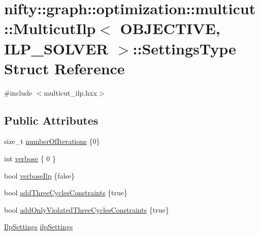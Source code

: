 \hypertarget{structnifty_1_1graph_1_1optimization_1_1multicut_1_1MulticutIlp_1_1SettingsType}{}\section{nifty\+:\+:graph\+:\+:optimization\+:\+:multicut\+:\+:Multicut\+Ilp$<$ O\+B\+J\+E\+C\+T\+I\+V\+E, I\+L\+P\+\_\+\+S\+O\+L\+V\+E\+R $>$\+:\+:Settings\+Type Struct Reference}
\label{structnifty_1_1graph_1_1optimization_1_1multicut_1_1MulticutIlp_1_1SettingsType}


{\ttfamily \#include $<$multicut\+\_\+ilp.\+hxx$>$}

\subsection*{Public Attributes}
\begin{DoxyCompactItemize}
\item 
size\+\_\+t \hyperlink{structnifty_1_1graph_1_1optimization_1_1multicut_1_1MulticutIlp_1_1SettingsType_a2c4240e17d6ac1872756bc9c1e50c1ca}{number\+Of\+Iterations} \{0\}
\item 
int \hyperlink{structnifty_1_1graph_1_1optimization_1_1multicut_1_1MulticutIlp_1_1SettingsType_a1c0ea9bfda256cb0a8049944f9ff3163}{verbose} \{ 0 \}
\item 
bool \hyperlink{structnifty_1_1graph_1_1optimization_1_1multicut_1_1MulticutIlp_1_1SettingsType_a21f5fd51ba414fc1ef13e42329072cb0}{verbose\+Ilp} \{false\}
\item 
bool \hyperlink{structnifty_1_1graph_1_1optimization_1_1multicut_1_1MulticutIlp_1_1SettingsType_a6a5e9a6a75b3289793cce6611c99b482}{add\+Three\+Cycles\+Constraints} \{true\}
\item 
bool \hyperlink{structnifty_1_1graph_1_1optimization_1_1multicut_1_1MulticutIlp_1_1SettingsType_a158132eb2567633736666a48f39ad8f1}{add\+Only\+Violated\+Three\+Cycles\+Constraints} \{true\}
\item 
\hyperlink{classnifty_1_1graph_1_1optimization_1_1multicut_1_1MulticutIlp_a80c305a79499dcbf64972c3da063425d}{Ilp\+Settings} \hyperlink{structnifty_1_1graph_1_1optimization_1_1multicut_1_1MulticutIlp_1_1SettingsType_a57518c56966171e4b675137ec8baf5d7}{ilp\+Settings}
\end{DoxyCompactItemize}


